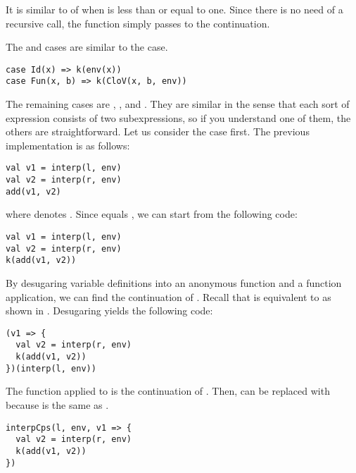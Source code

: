 It is similar to  of  when  is less than
or equal to one. Since there is no need of a recursive call, the function simply
passes  to the continuation.

The  and  cases are similar to the  case.

\begin{verbatim}
case Id(x) => k(env(x))
case Fun(x, b) => k(CloV(x, b, env))
\end{verbatim}

The remaining cases are , , and . They are similar
in the sense that each sort of expression consists of two subexpressions, so if you
understand one of them, the others are straightforward. Let us consider the  case
first. The previous implementation is as follows:

\begin{verbatim}
val v1 = interp(l, env)
val v2 = interp(r, env)
add(v1, v2)
\end{verbatim}

where  denotes .
Since  equals , we can start
from the following code:

\begin{verbatim}
val v1 = interp(l, env)
val v2 = interp(r, env)
k(add(v1, v2))
\end{verbatim}

By desugaring variable definitions into an anonymous function and a function
application, we can find the continuation of .
Recall that  is equivalent to  as shown
in . Desugaring yields the following code:

\begin{verbatim}
(v1 => {
  val v2 = interp(r, env)
  k(add(v1, v2))
})(interp(l, env))
\end{verbatim}

The function applied to  is the continuation of
. Then,  can be replaced with
 because  is the same as
.

\begin{verbatim}
interpCps(l, env, v1 => {
  val v2 = interp(r, env)
  k(add(v1, v2))
})
\end{verbatim}

